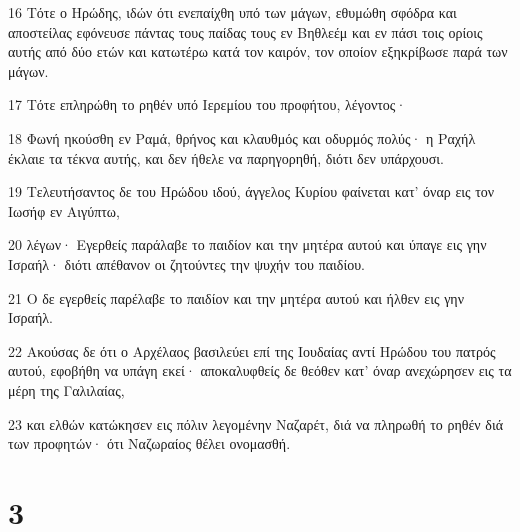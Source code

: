 \par 16 Τότε ο Ηρώδης, ιδών ότι ενεπαίχθη υπό των μάγων, εθυμώθη σφόδρα και αποστείλας εφόνευσε πάντας τους παίδας τους εν Βηθλεέμ και εν πάσι τοις ορίοις αυτής από δύο ετών και κατωτέρω κατά τον καιρόν, τον οποίον εξηκρίβωσε παρά των μάγων.
\par 17 Τότε επληρώθη το ρηθέν υπό Ιερεμίου του προφήτου, λέγοντος·
\par 18 Φωνή ηκούσθη εν Ραμά, θρήνος και κλαυθμός και οδυρμός πολύς· η Ραχήλ έκλαιε τα τέκνα αυτής, και δεν ήθελε να παρηγορηθή, διότι δεν υπάρχουσι.
\par 19 Τελευτήσαντος δε του Ηρώδου ιδού, άγγελος Κυρίου φαίνεται κατ' όναρ εις τον Ιωσήφ εν Αιγύπτω,
\par 20 λέγων· Εγερθείς παράλαβε το παιδίον και την μητέρα αυτού και ύπαγε εις γην Ισραήλ· διότι απέθανον οι ζητούντες την ψυχήν του παιδίου.
\par 21 Ο δε εγερθείς παρέλαβε το παιδίον και την μητέρα αυτού και ήλθεν εις γην Ισραήλ.
\par 22 Ακούσας δε ότι ο Αρχέλαος βασιλεύει επί της Ιουδαίας αντί Ηρώδου του πατρός αυτού, εφοβήθη να υπάγη εκεί· αποκαλυφθείς δε θεόθεν κατ' όναρ ανεχώρησεν εις τα μέρη της Γαλιλαίας,
\par 23 και ελθών κατώκησεν εις πόλιν λεγομένην Ναζαρέτ, διά να πληρωθή το ρηθέν διά των προφητών· ότι Ναζωραίος θέλει ονομασθή.

\chapter{3}

